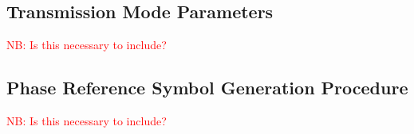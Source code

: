 \documentclass[class=report,11pt,crop=false]{standalone}
\begin{document}
\chapter{}

\section{Transmission Mode Parameters \label{sect:dab-values_t-mode}}

\textcolor{red}{NB: Is this necessary to include?}

\section{Phase Reference Symbol Generation Procedure \label{sect:dab-values_prs}}

\textcolor{red}{NB: Is this necessary to include?}

\ifstandalone
% 
\fi
\end{document}
